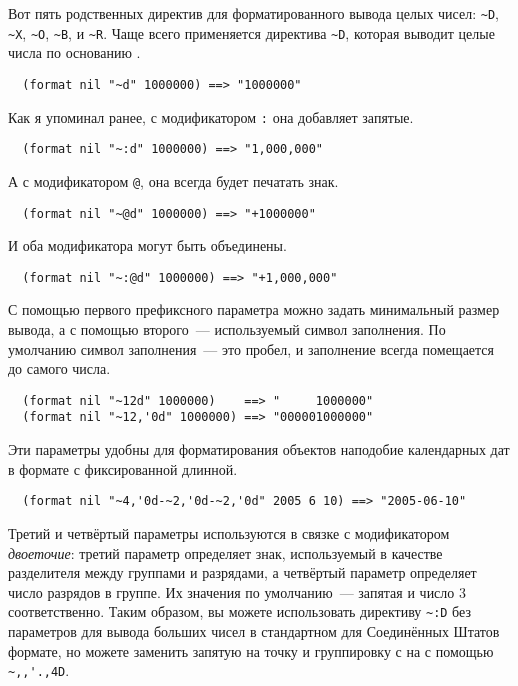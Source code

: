 Вот пять родственных директив для форматированного вывода целых чисел: \lstinline!~D!,
\lstinline!~X!, \lstinline!~O!, \lstinline!~B!, и \lstinline!~R!. Чаще всего применяется
директива \lstinline!~D!, которая выводит целые числа по основанию .

\begin{verbatim}
  (format nil "~d" 1000000) ==> "1000000"
\end{verbatim}

Как я упоминал ранее, с модификатором \lstinline!:! она добавляет запятые.

\begin{verbatim}
  (format nil "~:d" 1000000) ==> "1,000,000"
\end{verbatim}

А с модификатором \lstinline!@!, она всегда будет печатать знак.

\begin{verbatim}
  (format nil "~@d" 1000000) ==> "+1000000"
\end{verbatim}

И оба модификатора могут быть объединены.

\begin{verbatim}
  (format nil "~:@d" 1000000) ==> "+1,000,000"
\end{verbatim}

С помощью первого префиксного параметра можно задать минимальный размер вывода, а с
помощью второго~--- используемый символ заполнения. По умолчанию символ заполнения~--- это
пробел, и заполнение всегда помещается до самого числа.

\begin{verbatim}
  (format nil "~12d" 1000000)    ==> "     1000000"
  (format nil "~12,'0d" 1000000) ==> "000001000000"
\end{verbatim}

Эти параметры удобны для форматирования объектов наподобие календарных дат в формате с
фиксированной длинной.

\begin{verbatim}
  (format nil "~4,'0d-~2,'0d-~2,'0d" 2005 6 10) ==> "2005-06-10"
\end{verbatim}

Третий и четвёртый параметры используются в связке с модификатором \textit{двоеточие}:
третий параметр определяет знак, используемый в качестве разделителя между группами и
разрядами, а четвёртый параметр определяет число разрядов в группе. Их значения по
умолчанию~--- запятая и число 3 соответственно. Таким образом, вы можете использовать
директиву \lstinline!~:D! без параметров для вывода больших чисел в стандартном для
Соединённых Штатов формате, но можете заменить запятую на точку и группировку с 
на  с помощью \lstinline!~,,'.,4D!.

